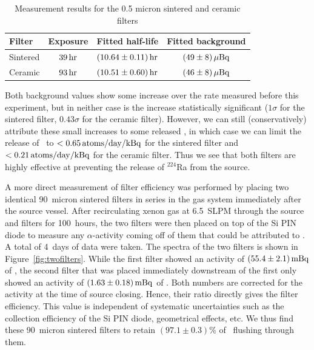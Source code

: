 \begin{table}[htb]
\centering
\caption{Measurement results for the 0.5 micron sintered and ceramic filters}
\label{tab:filter_limits}
\renewcommand{\arraystretch}{1.2}
\begin{tabular}{lccc}
\hline\hline
Filter & Exposure & Fitted half-life & Fitted background \\ \hline
Sintered & $39\, \mathrm{hr}$ & $(10.64\pm0.11)\, \mathrm{hr}$ & $(49\pm8)\, \mathrm{\mu Bq}$\\
Ceramic & $93\, \mathrm{hr}$ & $(10.51\pm0.60)\, \mathrm{hr}$ & $(46\pm8)\, \mathrm{\mu Bq}$\\
\hline\hline
\end{tabular}
\end{table}

Both background values show some increase over the rate measured before this experiment, but in neither case is the increase statistically significant ($1\sigma$ for the sintered filter, $0.43\sigma$ for the ceramic filter). However, we can still (conservatively) attribute these small increases to some released \Ra, in which case we can limit the release of \Ra~to $<0.65\, \mathrm{atoms/day/kBq}$ for the sintered filter and $<0.21\, \mathrm{atoms/day/kBq}$ for the ceramic filter. Thus we see that both filters are highly effective at preventing the release of $^{224}$Ra from the source.

A more direct measurement of filter efficiency was performed by placing two identical 90~micron sintered filters in series in the gas system immediately after the source vessel. After recirculating xenon gas at 6.5~SLPM through the source and filters for 100~hours, the two filters were then placed on top of the Si PIN diode to measure any $\alpha$-activity coming off of them that could be attributed to \Ra. A total of 4~days of data were taken. The spectra of the two filters is shown in Figure~\ref{fig:twofilters}. While the first filter showed an activity of $(55.4\pm2.1)\, \mathrm{mBq}$ of \Ra, the second filter that was placed immediately downstream of the first only showed an activity of $(1.63\pm0.18)\, \mathrm{mBq}$ of \Ra. Both numbers are corrected for the activity at the time of source closing. Hence, their ratio directly gives the filter efficiency. This value is independent of systematic uncertainties such as the collection efficiency of the Si PIN diode, geometrical effects, etc. We thus find these 90~micron sintered filters to retain $(97.1\pm0.3)$\% of \Ra~flushing through them.

